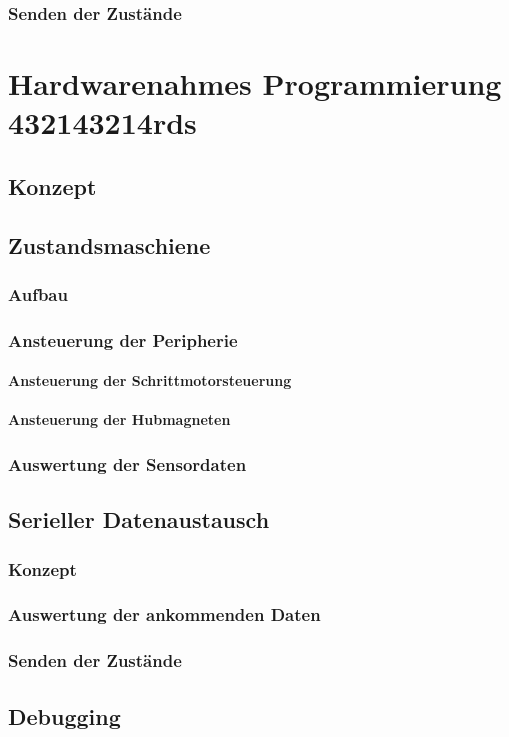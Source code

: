 \subsubsection{Senden der Zustände}





\section{Hardwarenahmes Programmierung 432143214rds}
\label{sec:board}
\subsection{Konzept}
\subsection{Zustandsmaschiene}
\subsubsection{Aufbau}
\subsubsection{Ansteuerung der Peripherie}
\paragraph{Ansteuerung der Schrittmotorsteuerung}
\paragraph{Ansteuerung der Hubmagneten}
\subsubsection{Auswertung der Sensordaten}

\subsection{Serieller Datenaustausch}
\subsubsection{Konzept}
\subsubsection{Auswertung der ankommenden Daten}
\subsubsection{Senden der Zustände}


\subsection{Debugging}



